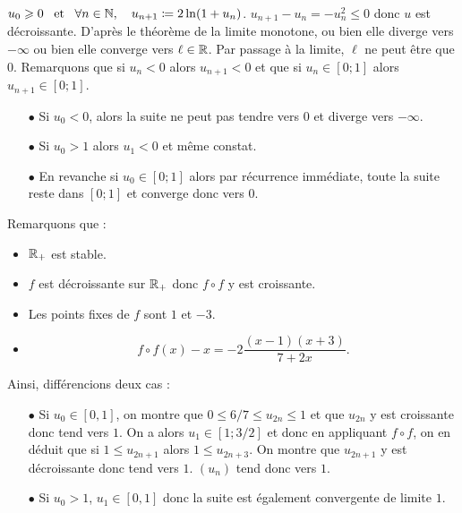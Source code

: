 \documentclass{magnolia}
\begin{document}
\begin{sol}
\begin{questions}
\question $u_0\geqslant 0 \quad\!\text{et}\quad\! \forall n\in\mathbb{N} ,\quad u_{n+1}\coloneqq 2\ln(1+u_n)$.
\question $u_{n+1}-u_n=-u_n^2\leq 0$ donc $u$ est décroissante. D'après le théorème de la limite monotone, ou bien elle diverge vers $-\infty$ ou bien elle converge vers $\ell \in \mathbb{R}$. Par passage à la limite, $\ell$ ne peut être que $0$.
Remarquons que si $u_n<0$ alors $u_{n+1}<0$ et que si $u_n\in [0;1]$ alors $u_{n+1}\in [0;1]$.
\begin{itemize}
\item[$\bullet$] Si $u_0<0$, alors la suite ne peut pas tendre vers $0$ et diverge vers $-\infty$. 
\item[$\bullet$] Si $u_0>1$ alors $u_1<0$ et même constat.
\item[$\bullet$] En revanche si $u_0\in[0;1]$ alors par récurrence immédiate, toute la suite reste dans $[0;1]$ et converge donc vers $0$.
\end{itemize}
\question Remarquons que :
\begin{itemize}
\item $\mathbb{R}_+$ est stable.
\item $f$ est décroissante sur $\mathbb{R}_+$ donc $f\circ f$  y est croissante.
\item Les points fixes de $f$ sont $1$ et $-3$.
\item $$f\circ f (x) -x=-2\dfrac{(x-1)(x+3)}{7+2x}.$$
\end{itemize}
Ainsi, différencions deux cas :
\begin{itemize}
\item[$\bullet$] Si $u_0\in [0,1]$, on montre que $0\leq 6/7 \leq u_{2n}\leq 1$ et que $u_{2n}$ y est croissante donc tend vers $1$.
On a alors $u_{1} \in [1;3/2]$ et donc en appliquant $f\circ f$, on en déduit que si $1\leq u_{2n+1}$ alors $1\leq u_{2n+3}$. On montre que $u_{2n+1}$ y est décroissante donc tend vers $1$.
$(u_n)$ tend donc vers $1$.
\item[$\bullet$] Si $u_0>1$, $u_1\in [0,1]$ donc la suite est également convergente de limite $1$.
\end{itemize}
\end{questions}
\end{sol}
\end{document}
